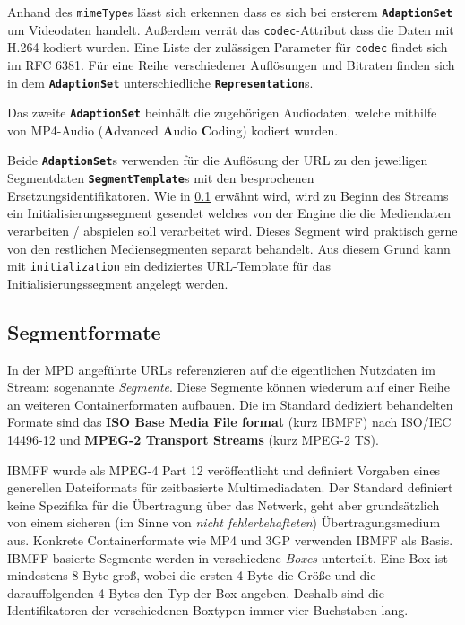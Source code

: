 \documentclass[paper = a4, fontsize = 12pt, parskip = half]{scrartcl} %
\def\attr#1{\texttt{#1}}
\def\elem#1{\texttt{\textbf{#1}}}
\begin{document}
Anhand des \attr{mimeType}s lässt sich erkennen dass es sich bei ersterem \elem{AdaptionSet} um Videodaten handelt. Außerdem verrät das \attr{codec}-Attribut dass die Daten mit H.264 kodiert wurden. Eine Liste der zulässigen Parameter für \attr{codec} findet sich im RFC 6381. Für eine Reihe verschiedener Auflösungen und Bitraten finden sich in dem \elem{AdaptionSet} unterschiedliche \elem{Representation}s.

Das zweite \elem{AdaptionSet} beinhält die zugehörigen Audiodaten, welche mithilfe von MP4-Audio (\textbf{A}dvanced \textbf{A}udio \textbf{C}oding) kodiert wurden.

Beide \elem{AdaptionSet}s verwenden für die Auflösung der URL zu den jeweiligen Segmentdaten \elem{SegmentTemplate}s mit den besprochenen Ersetzungsidentifikatoren. Wie in \ref{segment_formats} erwähnt wird, wird zu Beginn des Streams ein Initialisierungssegment gesendet welches von der Engine die die Mediendaten verarbeiten / abspielen soll verarbeitet wird. Dieses Segment wird praktisch gerne von den restlichen Mediensegmenten separat behandelt. Aus diesem Grund kann mit \attr{initialization} ein dediziertes URL-Template für das Initialisierungssegment angelegt werden.


\subsection{Segmentformate}
\label{segment_formats}
In der MPD angeführte URLs referenzieren auf die eigentlichen Nutzdaten im Stream: sogenannte \textit{Segmente}. Diese Segmente können wiederum auf einer Reihe an weiteren Containerformaten aufbauen. Die im Standard dediziert behandelten Formate sind das \textbf{ISO Base Media File format} (kurz IBMFF) nach ISO/IEC 14496-12 und \textbf{MPEG-2 Transport Streams} (kurz MPEG-2 TS).

IBMFF wurde als MPEG-4 Part 12 veröffentlicht und definiert Vorgaben eines generellen Dateiformats für zeitbasierte Multimediadaten. Der Standard definiert keine Spezifika für die Übertragung über das Netwerk, geht aber grundsätzlich von einem sicheren (im Sinne von \textit{nicht fehlerbehafteten}) Übertragungsmedium aus. Konkrete Containerformate wie MP4 und 3GP verwenden IBMFF als Basis. IBMFF-basierte Segmente werden in verschiedene \textit{Boxes} unterteilt. Eine Box ist mindestens 8 Byte groß, wobei die ersten 4 Byte die Größe und die darauffolgenden 4 Bytes den Typ der Box angeben. Deshalb sind die Identifikatoren der verschiedenen Boxtypen immer vier Buchstaben lang.
\end{document}
